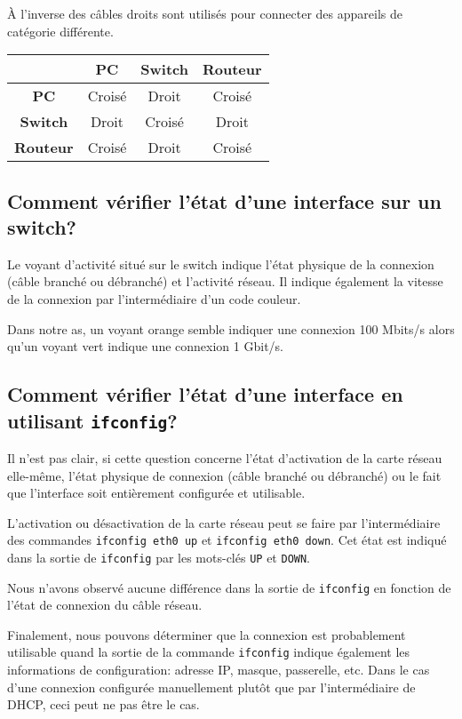 \documentclass[11pt,a4paper]{article}
\begin{document}
À l'inverse des câbles droits sont utilisés pour connecter des appareils de catégorie différente.

\begin{center}
\begin{tabular}{c|ccc}
	& \textbf{PC} & \textbf{Switch} & \textbf{Routeur} \\
	\hline
	\textbf{PC}      & Croisé & Droit  & Croisé \\
	\textbf{Switch}  & Droit  & Croisé & Droit  \\
	\textbf{Routeur} & Croisé & Droit  & Croisé \\
\end{tabular}
\end{center}

\subsection{Comment vérifier l'état d'une interface sur un switch?}

Le voyant d'activité situé sur le switch indique l'état physique de la connexion (câble branché ou débranché) et l'activité réseau. Il indique également la vitesse de la connexion par l'intermédiaire d'un code couleur.

Dans notre as, un voyant orange semble indiquer une connexion 100 Mbits/s alors qu'un voyant vert indique une connexion 1 Gbit/s.

\subsection{Comment vérifier l'état d'une interface en utilisant \texttt{ifconfig}?}

Il n'est pas clair, si cette question concerne l'état d'activation de la carte réseau elle-même, l'état physique de connexion (câble branché ou débranché) ou le fait que l'interface soit entièrement configurée et utilisable.

L'activation ou désactivation de la carte réseau peut se faire par l'intermédiaire des commandes \texttt{ifconfig eth0 up} et \texttt{ifconfig eth0 down}. Cet état est indiqué dans la sortie de \texttt{ifconfig} par les mots-clés \texttt{UP} et \texttt{DOWN}.

Nous n'avons observé aucune différence dans la sortie de \texttt{ifconfig} en fonction de l'état de connexion du câble réseau.

Finalement, nous pouvons déterminer que la connexion est probablement utilisable quand la sortie de la commande \texttt{ifconfig} indique également les informations de configuration: adresse IP, masque, passerelle, etc. Dans le cas d'une connexion configurée manuellement plutôt que par l'intermédiaire de DHCP, ceci peut ne pas être le cas.
\end{document}
